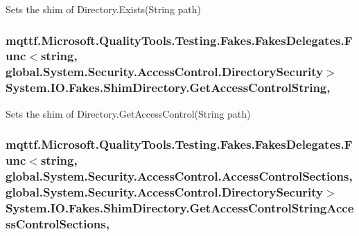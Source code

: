 Sets the shim of Directory.\-Exists(\-String path)

\hypertarget{class_system_1_1_i_o_1_1_fakes_1_1_shim_directory_a15cca0eef43209b7d650e10da340086c}{
\subsubsection[{Get\-Access\-Control\-String}]{\setlength{\rightskip}{0pt plus 5cm}mqttf.\-Microsoft.\-Quality\-Tools.\-Testing.\-Fakes.\-Fakes\-Delegates.\-Func$<$string, global.\-System.\-Security.\-Access\-Control.\-Directory\-Security$>$ System.\-I\-O.\-Fakes.\-Shim\-Directory.\-Get\-Access\-Control\-String\hspace{0.3cm}{\ttfamily [static]}, {\ttfamily [set]}}}\label{class_system_1_1_i_o_1_1_fakes_1_1_shim_directory_a15cca0eef43209b7d650e10da340086c}


Sets the shim of Directory.\-Get\-Access\-Control(\-String path)

\hypertarget{class_system_1_1_i_o_1_1_fakes_1_1_shim_directory_acf5e068d497c0d1a409bba403c7c143b}{
\subsubsection[{Get\-Access\-Control\-String\-Access\-Control\-Sections}]{\setlength{\rightskip}{0pt plus 5cm}mqttf.\-Microsoft.\-Quality\-Tools.\-Testing.\-Fakes.\-Fakes\-Delegates.\-Func$<$string, global.\-System.\-Security.\-Access\-Control.\-Access\-Control\-Sections, global.\-System.\-Security.\-Access\-Control.\-Directory\-Security$>$ System.\-I\-O.\-Fakes.\-Shim\-Directory.\-Get\-Access\-Control\-String\-Access\-Control\-Sections\hspace{0.3cm}{\ttfamily [static]}, {\ttfamily [set]}}}\label{class_system_1_1_i_o_1_1_fakes_1_1_shim_directory_acf5e068d497c0d1a409bba403c7c143b}



